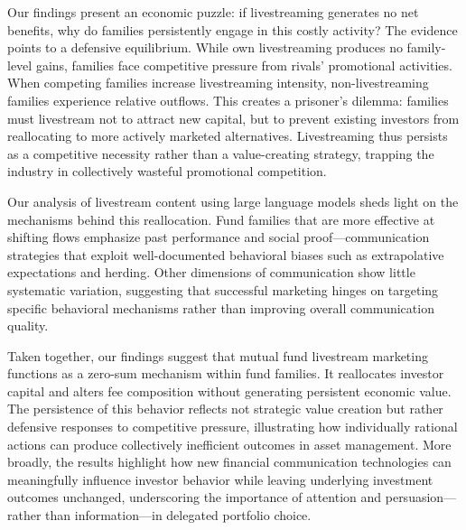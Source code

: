 \documentclass[12pt]{article}
\begin{document}
Our findings present an economic puzzle: if livestreaming generates no net benefits, why do families persistently engage in this costly activity? The evidence points to a defensive equilibrium. While own livestreaming produces no family-level gains, families face competitive pressure from rivals' promotional activities. When competing families increase livestreaming intensity, non-livestreaming families experience relative outflows. This creates a prisoner's dilemma: families must livestream not to attract new capital, but to prevent existing investors from reallocating to more actively marketed alternatives. Livestreaming thus persists as a competitive necessity rather than a value-creating strategy, trapping the industry in collectively wasteful promotional competition.

Our analysis of livestream content using large language models sheds light on the mechanisms behind this reallocation. Fund families that are more effective at shifting flows emphasize past performance and social proof—communication strategies that exploit well-documented behavioral biases such as extrapolative expectations and herding. Other dimensions of communication show little systematic variation, suggesting that successful marketing hinges on targeting specific behavioral mechanisms rather than improving overall communication quality.

Taken together, our findings suggest that mutual fund livestream marketing functions as a zero-sum mechanism within fund families. It reallocates investor capital and alters fee composition without generating persistent economic value. The persistence of this behavior reflects not strategic value creation but rather defensive responses to competitive pressure, illustrating how individually rational actions can produce collectively inefficient outcomes in asset management. More broadly, the results highlight how new financial communication technologies can meaningfully influence investor behavior while leaving underlying investment outcomes unchanged, underscoring the importance of attention and persuasion—rather than information—in delegated portfolio choice.


\end{document}

